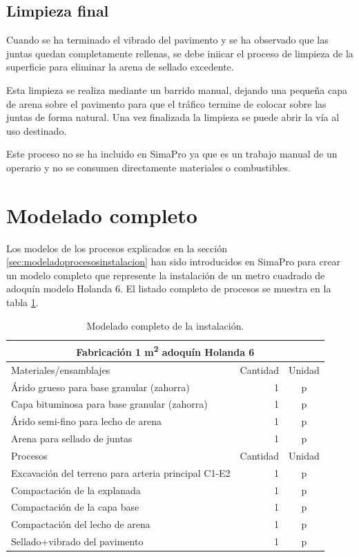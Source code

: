 \subsection{Limpieza final}

Cuando se ha terminado el vibrado del pavimento y se ha observado que las juntas quedan completamente rellenas, se debe iniicar el proceso de limpieza de la superficie para eliminar la arena de sellado excedente.

Esta limpieza se realiza mediante un barrido manual, dejando una pequeña capa de arena sobre el pavimento para que el tráfico termine de colocar sobre las juntas de forma natural. Una vez finalizada la limpieza se puede abrir la vía al uso destinado.

Este proceso no se ha incluido en SimaPro ya que es un trabajo manual de un operario y no se consumen directamente materiales o combustibles.

\section{Modelado completo}

Los modelos de los procesos explicados en la sección \ref{sec:modeladoprocesosinstalacion} han sido introducidos en SimaPro para crear un modelo completo que represente la instalación de un metro cuadrado de adoquín modelo Holanda 6. El listado completo de procesos se muestra en la tabla \ref{modeladocompletoinstalacion}.

\begin{table}[!htb]
\centering
\begin{tabular}{p{8cm}rc}
\toprule
\multicolumn{3}{c}{Fabricación 1 \si{m^2} adoquín Holanda 6}\\
\midrule
Materiales/ensamblajes & Cantidad & Unidad\\
\midrule
Árido grueso para base granular (zahorra) & 1 & p\\
Capa bituminosa para base granular (zahorra) & 1 & p\\
Árido semi-fino para lecho de arena & 1 & p\\
Arena para sellado de juntas & 1 & p\\
\midrule
Procesos & Cantidad & Unidad\\
\midrule
Excavación del terreno para arteria principal C1-E2 & 1 & p\\
Compactación de la explanada & 1 & p\\
Compactación de la capa base & 1 & p\\
Compactación del lecho de arena & 1 & p\\
Sellado+vibrado del pavimento & 1 & p\\
\bottomrule
\end{tabular}
\caption{Modelado completo de la instalación.}
\label{modeladocompletoinstalacion}
\end{table}

